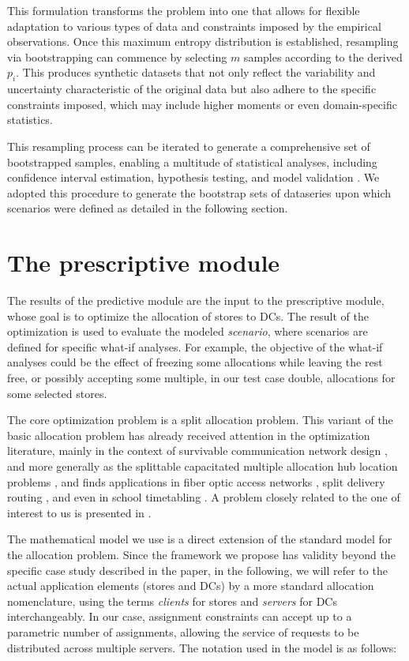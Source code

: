 \documentclass[ijoc,sglanonrev]{informs4}
\begin{document}
This formulation transforms the problem into one that allows for flexible adaptation to various types of data and constraints imposed by the empirical observations. Once this maximum entropy distribution is established, resampling via bootstrapping can commence by selecting  $m$ samples according to the derived $ p_i$.  This produces synthetic datasets that not only reflect the variability and uncertainty characteristic of the original data but also adhere to the specific constraints imposed, which may include higher moments or even domain-specific statistics. 

This resampling process can be iterated to generate a comprehensive set of bootstrapped samples, enabling a multitude of statistical analyses, including confidence interval estimation, hypothesis testing, and model validation \citep{efron1993introduction}. We adopted this procedure to generate the bootstrap sets of dataseries upon which scenarios were defined as detailed in the following section.

\section{The prescriptive module} \label{Sec:optimization}

The results of the predictive module are the input to the prescriptive module, whose goal is to optimize the allocation of stores to DCs. The result of the optimization is used to evaluate the modeled {\it scenario}, where scenarios are defined for specific what-if analyses. For example, the objective of the what-if analyses could be the effect of freezing some allocations while leaving the rest free, or possibly accepting some multiple, in our test case double, allocations for some selected stores. 

The core optimization problem is a split allocation problem. This variant of the basic allocation problem has already received attention in the optimization literature, mainly in the context of survivable communication network design \citep{EK98,MKE75}, and more generally as the splittable capacitated multiple allocation hub location problems \citep{M05}, and finds applications in fiber optic access networks \citep{KLH11}, split delivery routing \citep{DT89}, and even in school timetabling \citep{BBL07}. A problem closely related to the one of interest to us is presented in \citep{ZHHY21}.

The mathematical model we use is a direct extension of the standard model for the allocation problem. Since the framework we propose has validity beyond the specific case study described in the paper, in the following, we will refer to the actual application elements (stores and DCs) by a more standard allocation nomenclature, using the terms {\it clients} for stores and {\it servers} for DCs interchangeably. In our case, assignment constraints can accept up to a parametric number of assignments, allowing the service of requests to be distributed across multiple servers. The notation used in the model is as follows:
\end{document}
